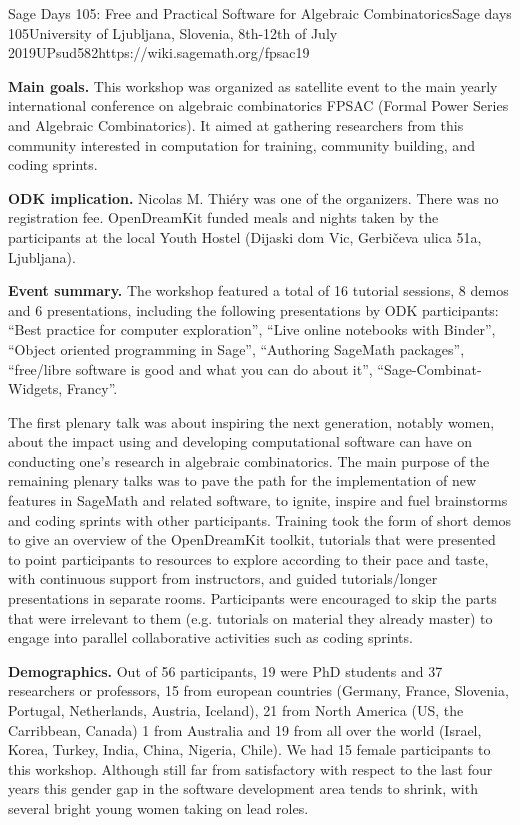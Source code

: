 \begin{event}{Sage Days 105: Free and Practical Software for Algebraic Combinatorics}{Sage days 105}{University of Ljubljana, Slovenia,
8th-12th of July 2019}{UPsud}{58}{2}{https://wiki.sagemath.org/fpsac19}

\textbf{Main goals.} This workshop was organized as satellite event to
the main yearly international conference on algebraic combinatorics
FPSAC (Formal Power Series and Algebraic Combinatorics). It aimed at
gathering researchers from this community interested in computation
for training, community building, and coding sprints.

\textbf{ODK implication.} Nicolas M. Thiéry  was one of the organizers.
There was no registration fee. OpenDreamKit funded meals and nights taken by the participants 
at the local Youth Hostel (Dijaski dom Vic, Gerbičeva ulica 51a, Ljubljana). 

\textbf{Event summary.} The workshop featured a total of 16 tutorial
sessions, 8 demos and 6 presentations, including the following
presentations by ODK participants: ``Best practice for computer
exploration'', ``Live online notebooks with Binder'', ``Object
oriented programming in Sage'', ``Authoring SageMath packages'',
``free/libre software is good and what you can do about it'',
``Sage-Combinat-Widgets, Francy''.

The first plenary talk was about inspiring the next generation,
notably women, about the impact using and developing computational
software can have on conducting one's research in algebraic
combinatorics. The main purpose of the remaining plenary talks was to
pave the path for the implementation of new features in SageMath and
related software, to ignite, inspire and fuel brainstorms and coding
sprints with other participants. Training took the form of short demos
to give an overview of the OpenDreamKit toolkit, tutorials that were
presented to point participants to resources to explore according to
their pace and taste, with continuous support from instructors, and
guided tutorials/longer presentations in separate rooms. Participants
were encouraged to skip the parts that were irrelevant to them (e.g.
tutorials on material they already master) to engage into parallel
collaborative activities such as coding sprints.

\textbf{Demographics.} Out of 56 participants, 19 were PhD students
and 37 researchers or professors, 15 from european countries 
(Germany, France, Slovenia, Portugal, Netherlands, Austria, Iceland), 21 from North America (US, the Carribbean, Canada) 
1 from Australia and 19 from all over the world (Israel, Korea, Turkey, India, China, Nigeria, Chile).
We had 15 female participants to this workshop. Although still far
from satisfactory with respect to the last four years
this gender gap in the software development area tends to shrink, with
several bright young women taking on lead roles.


\end{event}
